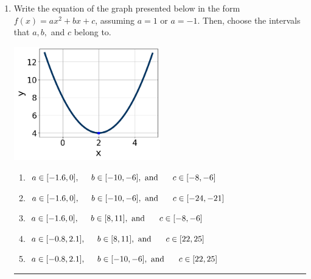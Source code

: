 \documentclass[14pt]{extbook}
\newcommand{\litem}[1]{\item#1\hspace*{-1cm}\rule{\textwidth}{0.4pt}}
\begin{document}
\begin{enumerate}
{\begin{enumerate}[label=\Alph*.]
\end{enumerate} }
\litem{
Write the equation of the graph presented below in the form $f(x)=ax^2+bx+c$, assuming  $a=1$ or $a=-1$. Then, choose the intervals that $a, b,$ and $c$ belong to.
\begin{center}
    \includegraphics[width=0.5\textwidth]{../Figures/quadraticGraphToEquationA.png}
\end{center}
\begin{enumerate}[label=\Alph*.]
\item \( a \in [-1.6, 0], \hspace*{5mm} b \in [-10, -6], \text{ and } \hspace*{5mm} c \in [-8, -6] \)
\item \( a \in [-1.6, 0], \hspace*{5mm} b \in [-10, -6], \text{ and } \hspace*{5mm} c \in [-24, -21] \)
\item \( a \in [-1.6, 0], \hspace*{5mm} b \in [8, 11], \text{ and } \hspace*{5mm} c \in [-8, -6] \)
\item \( a \in [-0.8, 2.1], \hspace*{5mm} b \in [8, 11], \text{ and } \hspace*{5mm} c \in [22, 25] \)
\item \( a \in [-0.8, 2.1], \hspace*{5mm} b \in [-10, -6], \text{ and } \hspace*{5mm} c \in [22, 25] \)

\end{enumerate} }
\end{enumerate}
\end{document}
